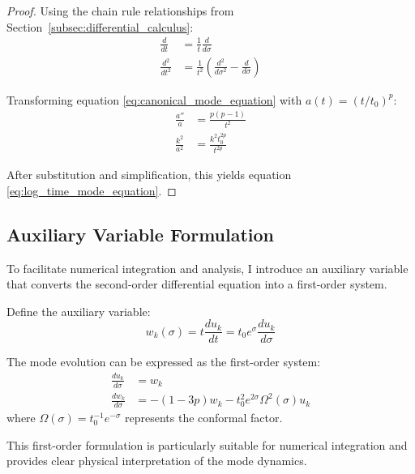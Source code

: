 \begin{proof}
Using the chain rule relationships from Section~\ref{subsec:differential_calculus}:
\begin{align}
\frac{d}{dt} &= \frac{1}{t} \frac{d}{d\sigma} \\
\frac{d^2}{dt^2} &= \frac{1}{t^2} \left( \frac{d^2}{d\sigma^2} - \frac{d}{d\sigma} \right)
\end{align}

Transforming equation \eqref{eq:canonical_mode_equation} with $a(t) = (t/t_0)^p$:
\begin{align}
\frac{a''}{a} &= \frac{p(p-1)}{t^2} \\
\frac{k^2}{a^2} &= \frac{k^2 t_0^{2p}}{t^{2p}}
\end{align}

After substitution and simplification, this yields equation \eqref{eq:log_time_mode_equation}.
\end{proof}

\subsection{Auxiliary Variable Formulation}
\label{subsec:auxiliary_variable}

To facilitate numerical integration and analysis, I introduce an auxiliary variable that converts the second-order differential equation into a first-order system.

\begin{definition}
Define the auxiliary variable:
\begin{equation}
w_k(\sigma) = t \frac{du_k}{dt} = t_0 e^\sigma \frac{du_k}{d\sigma}
\label{eq:auxiliary_variable}
\end{equation}
\end{definition}

\begin{theorem}
\label{thm:first_order_system}
The mode evolution can be expressed as the first-order system:
\begin{align}
\frac{du_k}{d\sigma} &= w_k \\
\frac{dw_k}{d\sigma} &= -(1-3p) w_k - t_0^2 e^{2\sigma} \Omega^2(\sigma) u_k
\label{eq:first_order_system}
\end{align}
where $\Omega(\sigma) = t_0^{-1} e^{-\sigma}$ represents the conformal factor.
\end{theorem}

This first-order formulation is particularly suitable for numerical integration and provides clear physical interpretation of the mode dynamics.


